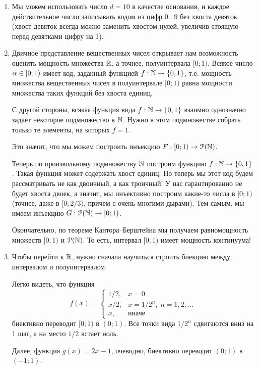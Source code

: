 \begin{enumerate}
\item Мы можем использовать число $d=10$ в качестве основания, и каждое действительное число записывать кодом из цифр $0\dots 9$ без хвоста девяток (хвост девяток всегда можно заменить хвостом нулей, увеличив стоящую перед девятками цифру на 1).
\item Двичное представление вещественных чисел открывает нам возможность оценить мощность множества $\mathbb R$, а точнее, полуинтервала $[0;1)$. Всякое число $\alpha\in[0;1)$ имеет код, заданный функцией $f:\mathbb N\to\{0,1\}$, т.е. мощность множества вещественных чисел в полуинтервале $[0;1)$ равна мощности множества таких функций без хвоста единиц.

С другой стороны, всякая функция вида $f:\mathbb N\to\{0,1\}$ взаимно однозначно задает некоторое подмножество в $\mathbb N$. Нужно в этом подмножестве собрать только те элементы, на которых $f=1$.

Это значит, что мы можем построить инъекцию $F:[0;1)\to\mathcal P(\mathbb N)$.

Теперь по произвольному подмножеству $\mathbb N$ построим функцию $f:\mathbb N\to\{0,1\}$. Такая функция может содержать хвост единиц. Но теперь мы этот код будем рассматривать не как двоичный, а как троичный! У нас гарантированно не будет хвоста двоек, а значит, мы инъективно построим какие-то числа в $[0;1)$ (точнее, даже в $[0;2/3)$, причем с очень многими дырами). Тем самым, мы имеем инъекцию $G:\mathcal P(\mathbb N)\to[0;1)$.

Окончательно, по теореме Кантора--Берштейна мы получаем равномощность множеств $[0;1)$ и $\mathcal P(\mathbb N)$. То есть, интервал $[0;1)$ имеет мощность континуума!
\item Чтобы перейти к $\mathbb R$, нужно сначала научиться строить биекцию между интервалом и полуинтервалом.

Легко видеть, что функция
$$
f(x) = \begin{cases}
1/2, & x=0 \\
x/2, & x=1/2^n,\; n=1,2,\dots \\
x, & \mbox{иначе}
\end{cases}
$$
биективно переводит $[0;1)$ в $(0;1)$. Все точки вида $1/2^n$ сдвигаются вниз на 1 шаг, а на место $1/2$ встает ноль.

Далее, функция $g(x)=2x-1$, очевидно, биективно переводит $(0;1)$ в $(-1;1)$.


\end{enumerate}
